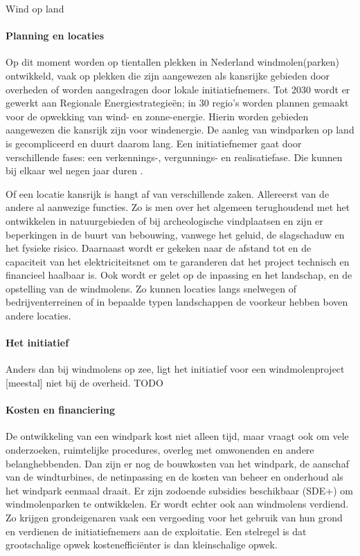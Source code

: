 \begin{voorstel}{Wind op land}
\begin{multicols}{2}
\begin{overwegingen}
\paragraph{Planning en locaties}
Op dit moment worden op tientallen plekken in Nederland windmolen(parken) ontwikkeld, vaak op plekken die zijn aangewezen als kansrijke gebieden door overheden of worden aangedragen door lokale initiatiefnemers. Tot 2030 wordt er gewerkt aan Regionale Energiestrategieën; in 30 regio’s worden plannen gemaakt voor de opwekking van wind- en zonne-energie. Hierin worden gebieden aangewezen die kansrijk zijn voor windenergie. De aanleg van windparken op land is gecompliceerd en duurt daarom lang. Een initiatiefnemer gaat door verschillende fases: een verkennings-, vergunnings- en realisatiefase. Die kunnen bij elkaar wel negen jaar duren \parencite{rijksdienst_voor_ondernemend_nederland_windenergie_nodate}.

Of een locatie kansrijk is hangt af van verschillende zaken. Allereerst van de andere al aanwezige functies. Zo is men over het algemeen terughoudend met het ontwikkelen in natuurgebieden of bij archeologische vindplaatsen en zijn er beperkingen in de buurt van bebouwing, vanwege het geluid, de slagschaduw en het fysieke risico. Daarnaast wordt er gekeken naar de afstand tot en de capaciteit van het elektriciteitsnet om te garanderen dat het project technisch en financieel haalbaar is. Ook wordt er gelet op de inpassing en het landschap, en de opstelling van de windmolens. Zo kunnen locaties langs snelwegen of bedrijventerreinen of in bepaalde typen landschappen de voorkeur hebben boven andere locaties.

\paragraph{Het initiatief}
Anders dan bij windmolens op zee, ligt het initiatief voor een windmolenproject [meestal] niet bij de overheid. TODO

\paragraph{Kosten en financiering}
De ontwikkeling van een windpark kost niet alleen tijd, maar vraagt ook om vele onderzoeken, ruimtelijke procedures, overleg met omwonenden en andere belanghebbenden. Dan zijn er nog de bouwkosten van het windpark, de aanschaf van de windturbines, de netinpassing en de kosten van beheer en onderhoud als het windpark eenmaal draait. Er zijn zodoende subsidies beschikbaar (SDE+) om windmolenparken te ontwikkelen. Er wordt echter ook aan windmolens verdiend. Zo krijgen grondeigenaren vaak een vergoeding voor het gebruik van hun grond en verdienen de initiatiefnemers aan de exploitatie. Een stelregel is dat grootschalige opwek kostenefficiënter is dan kleinschalige opwek.



\end{overwegingen}
\end{multicols}
\end{voorstel}
